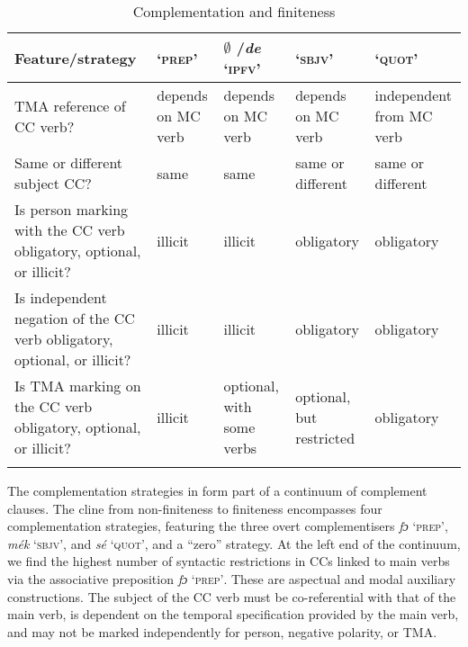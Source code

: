 \begin{sidewaystable}
\caption{Complementation and finiteness}
\label{tab:key:10.1}

\begin{tabularx}{\textwidth}{QlQQQ}
\lsptoprule

Feature/strategy &  ‘\textsc{prep}’ & \textsc{${\emptyset}$} /\textit{de} \textsc{‘ipfv’} &  ‘\textsc{sbjv}’ &  ‘\textsc{quot}’\\
\midrule
TMA reference of CC verb? & depends on MC verb & depends on MC verb & depends on MC verb & independent from MC verb\\

\tablevspace
Same or different subject CC? & same & same & same or different & same or different\\

\tablevspace
Is person marking with the CC verb obligatory, optional, or illicit? & illicit & illicit\par & obligatory & obligatory\\

\tablevspace
Is independent negation of the CC verb obligatory, optional, or illicit? & illicit & illicit & obligatory & obligatory\\

\tablevspace
Is TMA marking on the CC verb obligatory, optional, or illicit? & illicit & optional, with some verbs & optional, but restricted & obligatory\\
\lspbottomrule
\end{tabularx}
\end{sidewaystable}
The complementation strategies in  form part of a continuum of complement clauses. The cline from non-finiteness to finiteness encompasses four complementation strategies, featuring the three overt complementisers \textit{fɔ} ‘\textsc{prep}’, \textit{mék} ‘\textsc{sbjv}’, and \textit{sé} ‘\textsc{quot}’, and a “zero” strategy. At the left end of the continuum, we find the highest number of syntactic restrictions in CCs linked to main verbs via the associative preposition \textit{fɔ} \textsc{‘prep’}. These are aspectual and modal auxiliary constructions. The subject of the CC verb must be co-referential with that of the main verb, is dependent on the temporal specification provided by the main verb, and may not be marked independently for person, negative polarity, or TMA. 


